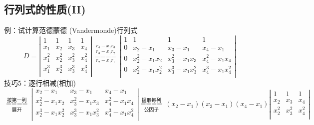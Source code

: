 \subsection{行列式的性质(II)}
{\color{blue}例：}试计算范德蒙德 (Vandermonde)行列式
$$
D=\left| \begin{matrix}
1 & 1 & 1 & 1  \\
{{x}_{1}} & {{x}_{2}} & {{x}_{3}} & {{x}_{4}}  \\
x_{1}^{2} & x_{2}^{2} & x_{3}^{2} & x_{4}^{2}  \\
x_{1}^{3} & x_{2}^{3} & x_{3}^{3} & x_{4}^{3}  \\
\end{matrix} \right|
\underset{{{r}_{2}}-{{x}_{1}}{{r}_{1}}}{\overset{\begin{smallmatrix} 
{{r}_{4}}-{{x}_{1}}{{r}_{3}} \\ 
{{r}_{3}}-{{x}_{1}}{{r}_{2}} 
\end{smallmatrix}}{\mathop{====}}}
\left| \begin{matrix}
1 & 1 & 1 & 1  \\
0 & {{x}_{2}}-{{x}_{1}} & {{x}_{3}}-{{x}_{1}} & {{x}_{4}}-{{x}_{1}}  \\
0 & x_{2}^{2}-{{x}_{1}}{{x}_{2}} & x_{3}^{2}-{{x}_{1}}{{x}_{3}} & x_{4}^{2}-{{x}_{1}}{{x}_{4}}  \\
0 & x_{2}^{3}-{{x}_{1}}x_{2}^{2} & x_{3}^{3}-{{x}_{1}}x_{3}^{2} & x_{4}^{3}-{{x}_{1}}x_{4}^{2}  \\
\end{matrix} \right|
$$
{\color{blue}技巧5：}逐行相减(相加)
$$
\underset{\mbox{展开}}{\overset{\mbox{按第一列}}{\mathop{====}}}\,
\left| \begin{matrix}
{{x}_{2}}-{{x}_{1}} & {{x}_{3}}-{{x}_{1}} & {{x}_{4}}-{{x}_{1}}  \\
x_{2}^{2}-{{x}_{1}}{{x}_{2}} & x_{3}^{2}-{{x}_{1}}{{x}_{3}} & x_{4}^{2}-{{x}_{1}}{{x}_{4}}  \\
x_{2}^{3}-{{x}_{1}}x_{2}^{2} & x_{3}^{3}-{{x}_{1}}x_{3}^{2} & x_{4}^{3}-{{x}_{1}}x_{4}^{2}  \\
\end{matrix} \right|
\underset{\mbox{公因子}}{\overset{\mbox{提取每列}}{\mathop{====}}}\,
({{x}_{2}}-{{x}_{1}})({{x}_{3}}-{{x}_{1}})({{x}_{4}}-{{x}_{1}})\left| \begin{matrix}
1 & 1 & 1  \\
{{x}_{2}} & {{x}_{3}} & {{x}_{4}}  \\
x_{2}^{2} & x_{3}^{2} & x_{4}^{2}  \\
\end{matrix} \right|
$$
